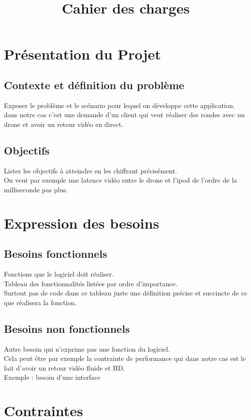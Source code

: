 \documentclass{article}
\title{Cahier des charges}
\begin{document}
\sectionfont{\underline}

\maketitle
\section{Présentation du Projet}
	\subsection{Contexte et définition du problème}
		Exposer le problème et le scénario pour lequel on développe cette application.\\
		dans notre cas c'est une demande d'un client qui veut réaliser des rondes avec un drone et avoir un retour vidéo en direct.
	\subsection{Objectifs}
		Lister les objectifs à atteindre en les chiffrant précisément.\\
		On veut par exemple une latence vidéo entre le drone et l'ipod de l'ordre de la milliseconde pas plus.
\section{Expression des besoins}
	\subsection{Besoins fonctionnels}
		Fonctions que le logiciel doit réaliser.\\
		Tableau des fonctionnalités listées par ordre d'importance.\\
		Surtout pas de code dans ce tableau juste une définition précise et succincte de ce que réalisera la fonction.
	\subsection{Besoins non fonctionnels}
		Autre besoin qui n'exprime pas une fonction du logiciel.\\
		Cela peut être par exemple la contrainte de performance qui dans notre cas est le fait d'avoir un retour vidéo fluide et HD.\\
		Exemple : besoin d'une interface 
\section{Contraintes}
\end{document}
